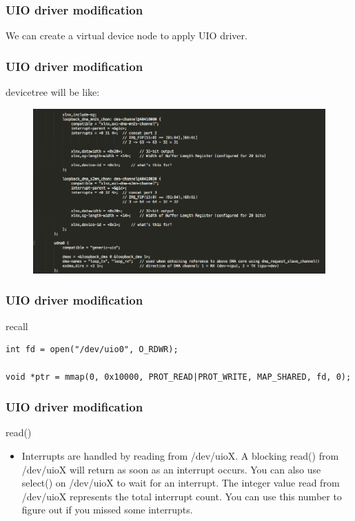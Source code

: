 \documentclass{beamer}
\begin{document}
\begin{frame}
\frametitle{UIO driver modification}
\centering We can create a virtual device node to apply UIO driver.
\end{frame}

\begin{frame}[fragile]
\frametitle{UIO driver modification}
\centering devicetree will be like:
\begin{figure}
\centering\includegraphics[scale=0.3]{devicetree2.png}
\end{figure}
\end{frame}


\begin{frame}[fragile]
\frametitle{UIO driver modification}
\centering recall\\
\begin{verbatim}
int fd = open("/dev/uio0", O_RDWR);

void *ptr = mmap(0, 0x10000, PROT_READ|PROT_WRITE, MAP_SHARED, fd, 0);

\end{verbatim}
\end{frame}

\begin{frame}
\frametitle{UIO driver modification}
read()
\centering \\
\begin{itemize}
\item Interrupts are handled by reading from /dev/uioX. A blocking read() from /dev/uioX will return as soon as an interrupt occurs. You can also use select() on /dev/uioX to wait for an interrupt. The integer value read from /dev/uioX represents the total interrupt count. You can use this number to figure out if you missed some interrupts.
\end{itemize}
\end{frame}
\end{document}
